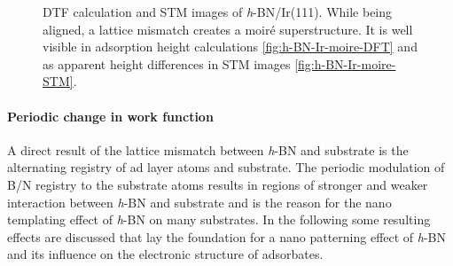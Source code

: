 \begin{figure} \centering
	 \quad
	\caption{DTF calculation and STM images of \textit{h}-BN/Ir(111). While being aligned, a lattice mismatch creates a moir\'e  superstructure. It is well visible in adsorption height calculations \ref{fig:h-BN-Ir-moire-DFT} and as apparent height differences in STM images \ref{fig:h-BN-Ir-moire-STM}.}
	\label{fig:moire-DFT-TSM}
\end{figure}


\paragraph{Periodic change in work function}
A direct result of the lattice mismatch between \textit{h}-BN and substrate is the alternating registry of ad layer atoms and substrate. The periodic modulation of B/N registry to the substrate atoms results in regions of stronger and weaker interaction between \textit{h}-BN and substrate and is the reason for the nano templating effect of \textit{h}-BN on many substrates. 
In the following some resulting effects are discussed that lay the foundation for a nano patterning effect of \textit{h}-BN and its influence on the electronic structure of adsorbates.

